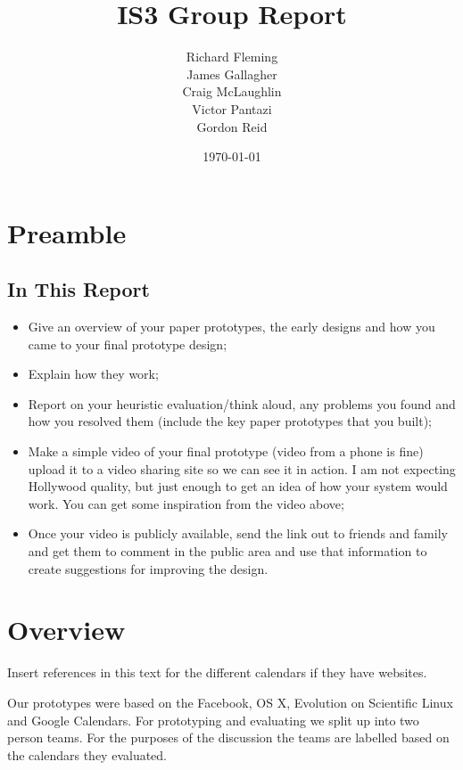 \documentclass{article}
\title{IS3 Group Report}
\author{
  Richard Fleming \\
  James Gallagher \\
  Craig McLaughlin \\
  Victor Pantazi \\
  Gordon Reid}
\date{\today}
\begin{document}

\maketitle


\section{Preamble}

\subsection{In This Report}

\begin{itemize}
\item Give an overview of your paper prototypes, the early designs and
how you came to your final prototype design;

\item Explain how they work;

\item Report on your heuristic evaluation/think aloud, any problems you
found and how you resolved them (include the key paper prototypes that
you built);

\item Make a simple video of your final prototype (video from a phone
is fine) upload it to a video sharing site so we can see it in action.
I am not expecting Hollywood quality, but just enough to get an idea
of how your system would work. You can get some inspiration from the
video above;

\item Once your video is publicly available, send the link out to
friends and family and get them to comment in the public area and use
that information to create suggestions for improving the design.
\end{itemize}

\section{Overview}

Insert references in this text for the different calendars if they
have websites.

Our prototypes were based on the Facebook, OS X, Evolution on Scientific
Linux and Google Calendars. For prototyping and evaluating we split up
into two person teams. For the purposes of the discussion the teams are
labelled based on the calendars they evaluated.
\end{document}
